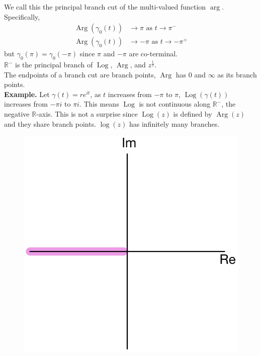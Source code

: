 \documentclass[11pt]{article}
\begin{document}
We call this the principal branch cut of the multi-valued function $\operatorname{arg}$. Specifically, 
\begin{align*} 
\operatorname{Arg}(\gamma_0(t)) &\to \pi \mbox{ as } t \to \pi^- \\
\operatorname{Arg}(\gamma_0(t)) &\to -\pi \mbox{ as } t \to -\pi^+
\end{align*} 
but $\gamma_0(\pi) = \gamma_0(-\pi)$ since $\pi$ and $-\pi$ are co-terminal. \\
$\mathbb{R}^-$ is the principal branch of $\operatorname{Log}$, $\operatorname{Arg}$, and $z^{\frac{1}{2}}$. \\
The endpoints of a branch cut are branch points, $\operatorname{Arg}$ has 0 and $\infty$ as its branch points. \\
\newline
\textbf{Example.} Let $\gamma(t) = re^{it}$, as $t$ increases from $-\pi$ to $\pi$, $\operatorname{Log}(\gamma(t))$ increases from $-\pi i$ to $\pi i$. This means $\operatorname{Log}$ is not continuous along $\mathbb{R}^{-}$, the negative $\mathbb{R}$-axis. This is not a surprise since $\operatorname{Log}(z)$ is defined by $\operatorname{Arg}(z)$ and they share branch points.  
$\operatorname{log}(z)$ has infinitely many branches. 
\begin{figure}[H]
\includegraphics[scale = 0.2]{5_4}
\centering
\end{figure}
\end{document}
